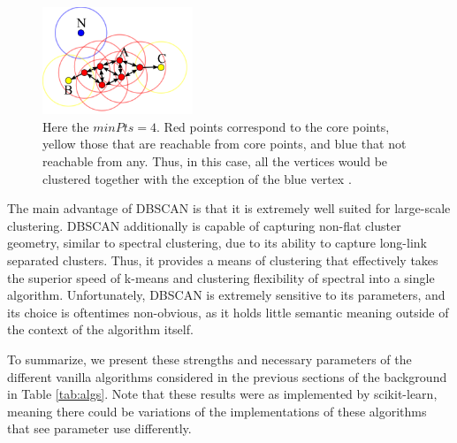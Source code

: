 \documentclass[journal]{IEEEtran}
\begin{document}
\begin{figure}
    \label{fig:dbscan}
    \centering
    \includegraphics[width=0.4\textwidth]{dbscan.png}
    \caption{Here the $minPts=4$. Red points correspond to the core points, yellow those that are reachable from core points, and blue that not reachable from any. Thus, in this case, all the vertices would be clustered together with the exception of the blue vertex \cite{wiki-dbscan}.}
\end{figure}

The main advantage of DBSCAN is that it is extremely well suited for large-scale clustering. DBSCAN additionally is capable of capturing non-flat cluster geometry, similar to spectral clustering, due to its ability to capture long-link separated clusters. Thus, it provides a means of clustering that effectively takes the superior speed of k-means and clustering flexibility of spectral into a single algorithm. Unfortunately, DBSCAN is extremely sensitive to its parameters, and its choice is oftentimes non-obvious, as it holds little semantic meaning outside of the context of the algorithm itself.

To summarize, we present these strengths and necessary parameters of the different vanilla algorithms considered in the previous sections of the background in Table \ref{tab:algs}. Note that these results were as implemented by scikit-learn, meaning there could be variations of the implementations of these algorithms that see parameter use differently.
\end{document}
